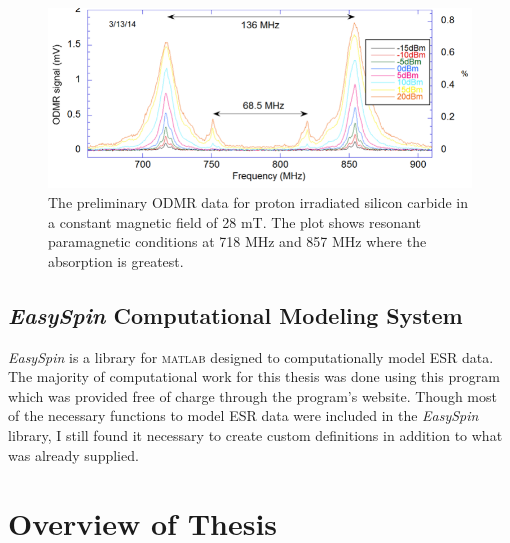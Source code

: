 \documentclass[oneside, noacknowlegments]{BYUPhys}
\begin{document}
\begin{figure}[h]
    \centerline{\includegraphics{prelim_odmr_fig}}
    \caption[Preliminary ODMR Data]{\label{fig:PrelimODMR}
     The preliminary ODMR data for proton irradiated silicon carbide in a constant magnetic field of 28 mT. The plot shows resonant paramagnetic conditions at 718 MHz and 857 MHz where the absorption is greatest. }
\end{figure}

\subsection{\textit{EasySpin} Computational Modeling System}

\textit{EasySpin} \cite{RefWorks:doc:589299fbe4b0dec22aee3bd8} is a library for \textsc{matlab} designed to computationally model ESR data. The majority of computational work for this thesis was done using this program which was provided free of charge through the program's website. Though most of the necessary functions to model ESR data were included in the \textit{EasySpin} library, I still found it necessary to create custom definitions in addition to what was already supplied.

\section{Overview of Thesis}
\end{document}
